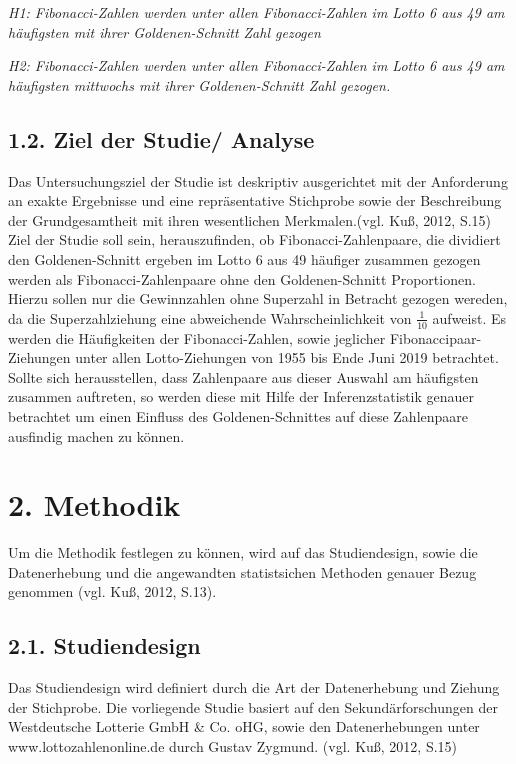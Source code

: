 \documentclass[ngerman,]{article}
\begin{document}
\emph{H1: Fibonacci-Zahlen werden unter allen Fibonacci-Zahlen im Lotto
6 aus 49 am häufigsten mit ihrer Goldenen-Schnitt Zahl gezogen}

\emph{H2: Fibonacci-Zahlen werden unter allen Fibonacci-Zahlen im Lotto
6 aus 49 am häufigsten mittwochs mit ihrer Goldenen-Schnitt Zahl
gezogen.}

\subsection{1.2. Ziel der Studie/
Analyse}\label{ziel-der-studie-analyse}

Das Untersuchungsziel der Studie ist deskriptiv ausgerichtet mit der
Anforderung an exakte Ergebnisse und eine repräsentative Stichprobe
sowie der Beschreibung der Grundgesamtheit mit ihren wesentlichen
Merkmalen.(vgl. Kuß, 2012, S.15) Ziel der Studie soll sein,
herauszufinden, ob Fibonacci-Zahlenpaare, die dividiert den
Goldenen-Schnitt ergeben im Lotto 6 aus 49 häufiger zusammen gezogen
werden als Fibonacci-Zahlenpaare ohne den Goldenen-Schnitt Proportionen.
Hierzu sollen nur die Gewinnzahlen ohne Superzahl in Betracht gezogen
wereden, da die Superzahlziehung eine abweichende Wahrscheinlichkeit von
\(\frac{1}{10}\) aufweist. Es werden die Häufigkeiten der
Fibonacci-Zahlen, sowie jeglicher Fibonaccipaar-Ziehungen unter allen
Lotto-Ziehungen von 1955 bis Ende Juni 2019 betrachtet. Sollte sich
herausstellen, dass Zahlenpaare aus dieser Auswahl am häufigsten
zusammen auftreten, so werden diese mit Hilfe der Inferenzstatistik
genauer betrachtet um einen Einfluss des Goldenen-Schnittes auf diese
Zahlenpaare ausfindig machen zu können.

\section{2. Methodik}\label{methodik}

Um die Methodik festlegen zu können, wird auf das Studiendesign, sowie
die Datenerhebung und die angewandten statistsichen Methoden genauer
Bezug genommen (vgl. Kuß, 2012, S.13).

\subsection{2.1. Studiendesign}\label{studiendesign}

Das Studiendesign wird definiert durch die Art der Datenerhebung und
Ziehung der Stichprobe. Die vorliegende Studie basiert auf den
Sekundärforschungen der Westdeutsche Lotterie GmbH \& Co. oHG, sowie den
Datenerhebungen unter www.lottozahlenonline.de durch Gustav Zygmund.
(vgl. Kuß, 2012, S.15)
\end{document}
